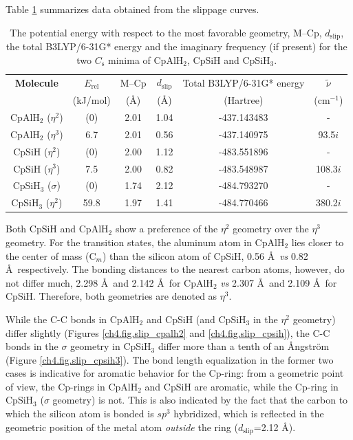 Table \ref{ch4.tab.slip} summarizes data obtained from the slippage curves.
\begin{table}[htbp]
\center
\caption{The potential energy with respect to the most favorable geometry, M--Cp, $d_\mathrm{slip}$, the total B3LYP/6-31G* energy and the imaginary frequency (if present) for the two $C_\mathrm{s}$ minima of CpAlH$_2$, CpSiH and CpSiH$_3$.}
\begin{tabular}{|c|c|c|c|c|c|}
\hline
\textbf{Molecule}&
$E_\mathrm{rel}$&
M--Cp&
$d_\mathrm{slip}$&Total B3LYP/6-31G* energy&
$\tilde{\nu}$\\
&(kJ/mol)&(\AA)&(\AA)&(Hartree)& (cm$^{-1}$)\\
\hline
CpAlH$_2$ ($\eta^{2}$) & (0)  & 2.01 & 1.04 & -437.143483 & -\\
CpAlH$_2$ ($\eta^{3}$) & 6.7  & 2.01 & 0.56 & -437.140975 & 93.5$i$ \\
CpSiH ($\eta^{2}$) & (0)  & 2.00 & 1.12 & -483.551896 & -\\
CpSiH ($\eta^{3}$) & 7.5  & 2.00 & 0.82 & -483.548987 & 108.3$i$ \\
CpSiH$_3$ ($\sigma$) & (0)  & 1.74 & 2.12 & -484.793270 & - \\
CpSiH$_3$ ($\eta^{2}$) & 59.8 & 1.97 & 1.41 & -484.770466 & 380.2$i$ \\
\hline
\end{tabular}
\label{ch4.tab.slip}
\end{table}
Both CpSiH and CpAlH$_2$ show a preference of the $\eta^{2}$ geometry over the $\eta^{3}$ geometry. For the transition states, the aluminum atom in CpAlH$_2$ lies closer to the center of mass (C$_m$) than the silicon atom of CpSiH, 0.56 \AA\ \textit{vs} 0.82 \AA\ respectively. The bonding distances to the nearest carbon atoms, however, do not differ much, 2.298 \AA\ and 2.142 \AA\ for CpAlH$_2$ \textit{vs} 2.307 \AA\ and 2.109 \AA\ for CpSiH. Therefore, both geometries are denoted as $\eta^{3}$.

While the C-C bonds in CpAlH$_2$ and CpSiH (and CpSiH$_3$ in the $\eta^2$ geometry) differ slightly (Figures \ref{ch4.fig.slip_cpalh2} and \ref{ch4.fig.slip_cpsih}), the C-C bonds in the $\sigma$ geometry in CpSiH$_3$ differ more than a tenth of an \AA ngstr\"{o}m (Figure \ref{ch4.fig.slip_cpsih3}). The bond length equalization in the former two cases is indicative for aromatic behavior for the Cp-ring: from a geometric point of view, the Cp-rings in CpAlH$_2$ and CpSiH are aromatic, while the Cp-ring in CpSiH$_3$ ($\sigma$ geometry) is not. This is also indicated by the fact that the carbon to which the silicon atom is bonded is $sp^3$ hybridized, which is reflected in the geometric position of the metal atom \textit{outside} the ring ($d_\mathrm{slip}$=2.12 \AA). 

